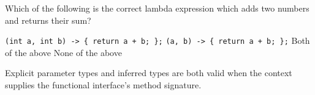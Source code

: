 \newpage


\question[4]
Which of the following is the correct lambda expression which adds two numbers and returns their sum?
\begin{choices}
  \choice \texttt{(int a, int b) -> \{ return a + b; \};}
  \choice \texttt{(a, b) -> \{ return a + b; \};}
  \CorrectChoice Both of the above
  \choice None of the above
\end{choices}
\begin{solution}
  Explicit parameter types and inferred types are both valid when the context supplies the functional interface's method signature.
\end{solution}

